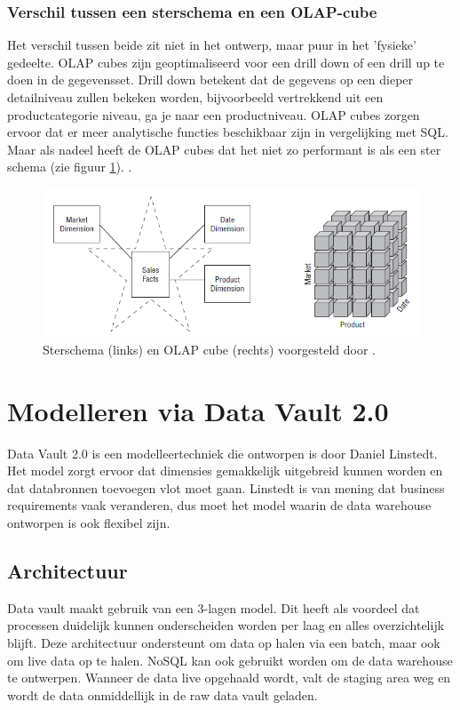 \subsubsection{Verschil tussen een sterschema en een OLAP-cube}
Het verschil tussen beide zit niet in het ontwerp, maar puur in het 'fysieke' gedeelte.
OLAP cubes zijn geoptimaliseerd voor een drill down of een drill up te doen in de gegevensset.
Drill down betekent dat de gegevens op een dieper detailniveau zullen bekeken worden, bijvoorbeeld vertrekkend uit een productcategorie niveau, ga je naar een productniveau. OLAP cubes zorgen ervoor dat er meer analytische functies beschikbaar zijn in vergelijking met SQL. Maar als nadeel heeft de OLAP cubes dat het niet zo performant is als een ster schema  (zie figuur \ref{fig:stervsolap}).  \autocite{Kimball2013}. 

\begin{figure}[h]
	\includegraphics[scale=0.8]{../images/starvsolap.PNG}
	\caption{Sterschema (links) en OLAP cube (rechts) voorgesteld door \textcite{Kimball2013}.}
	\label{fig:stervsolap}
\end{figure}
\pagebreak
\section{Modelleren via Data Vault 2.0}
Data Vault 2.0 is een modelleertechniek die ontworpen is door Daniel Linstedt. Het model zorgt ervoor dat dimensies gemakkelijk uitgebreid kunnen worden en dat databronnen toevoegen vlot moet gaan. Linstedt is van mening dat business requirements vaak veranderen, dus moet het model waarin de data warehouse ontworpen is ook flexibel zijn. 
~\autocite{Linstedt2016}
\subsection{Architectuur}
Data vault maakt gebruik van een 3-lagen model. Dit heeft als voordeel dat processen duidelijk kunnen onderscheiden worden per laag en alles overzichtelijk blijft. Deze architectuur ondersteunt om data op halen via een batch, maar ook om live data op te halen. NoSQL kan ook gebruikt worden om de data warehouse te ontwerpen. Wanneer de data live opgehaald wordt, valt de staging area weg en wordt de data onmiddellijk in de raw data vault geladen.  ~\autocite{Linstedt2016}


